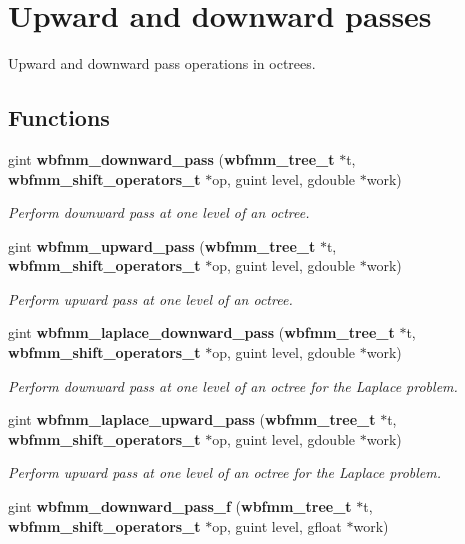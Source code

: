 \section{Upward and downward passes}
\label{group__pass}


Upward and downward pass operations in octrees.  


\subsection*{Functions}
\begin{DoxyCompactItemize}
\item 
gint {\bf wbfmm\+\_\+downward\+\_\+pass} ({\bf wbfmm\+\_\+tree\+\_\+t} $\ast$t, {\bf wbfmm\+\_\+shift\+\_\+operators\+\_\+t} $\ast$op, guint level, gdouble $\ast$work)
\begin{DoxyCompactList}\small\item\em Perform downward pass at one level of an octree. \end{DoxyCompactList}\item 
gint {\bf wbfmm\+\_\+upward\+\_\+pass} ({\bf wbfmm\+\_\+tree\+\_\+t} $\ast$t, {\bf wbfmm\+\_\+shift\+\_\+operators\+\_\+t} $\ast$op, guint level, gdouble $\ast$work)
\begin{DoxyCompactList}\small\item\em Perform upward pass at one level of an octree. \end{DoxyCompactList}\item 
gint {\bf wbfmm\+\_\+laplace\+\_\+downward\+\_\+pass} ({\bf wbfmm\+\_\+tree\+\_\+t} $\ast$t, {\bf wbfmm\+\_\+shift\+\_\+operators\+\_\+t} $\ast$op, guint level, gdouble $\ast$work)
\begin{DoxyCompactList}\small\item\em Perform downward pass at one level of an octree for the Laplace problem. \end{DoxyCompactList}\item 
gint {\bf wbfmm\+\_\+laplace\+\_\+upward\+\_\+pass} ({\bf wbfmm\+\_\+tree\+\_\+t} $\ast$t, {\bf wbfmm\+\_\+shift\+\_\+operators\+\_\+t} $\ast$op, guint level, gdouble $\ast$work)
\begin{DoxyCompactList}\small\item\em Perform upward pass at one level of an octree for the Laplace problem. \end{DoxyCompactList}\item 
gint {\bf wbfmm\+\_\+downward\+\_\+pass\+\_\+f} ({\bf wbfmm\+\_\+tree\+\_\+t} $\ast$t, {\bf wbfmm\+\_\+shift\+\_\+operators\+\_\+t} $\ast$op, guint level, gfloat $\ast$work)

\end{DoxyCompactItemize}
